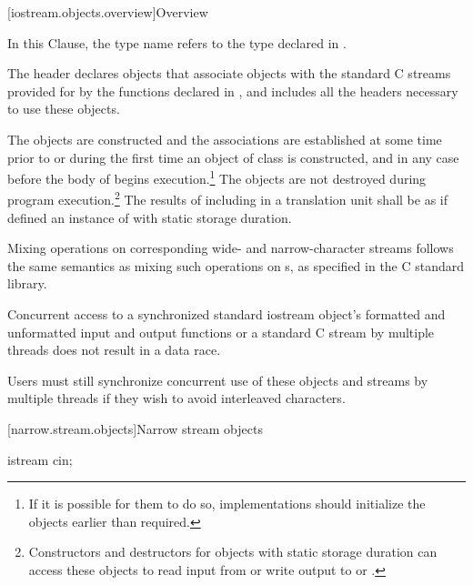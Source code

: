 [iostream.objects.overview]{Overview}

\pnum
In this Clause, the type name  refers to
the type  declared in .

\pnum
The header 
declares objects that associate objects with the
standard C streams provided for by the functions declared in
, and includes all the headers necessary to use these objects.

\pnum
The objects are constructed and the associations are established at some
time prior to or during the first time an object of class
 is constructed, and in any case before the body
of  begins execution.\footnote{If it is possible for them to do so, implementations should
initialize the objects earlier than required.}
The objects are not destroyed during program execution.\footnote{Constructors and destructors for objects with
static storage duration can
access these objects to read input from
or write output to
or
.
}
The results of including  in a translation unit shall be as if
 defined an instance of  with static
storage duration.

\pnum
Mixing operations on corresponding wide- and narrow-character streams
follows the same semantics as mixing such operations on
s,
as specified in the C standard library.

\pnum
Concurrent access to a synchronized standard iostream object's formatted and unformatted input and output functions or a standard C stream by multiple threads does not result in a data race.
\begin{note}
Users must still synchronize concurrent use of these objects and streams by multiple threads if they wish to avoid interleaved characters.
\end{note}


[narrow.stream.objects]{Narrow stream objects}

\begin{indexed}{}
\begin{itemdecl}
istream cin;
\end{itemdecl}
\end{indexed}

